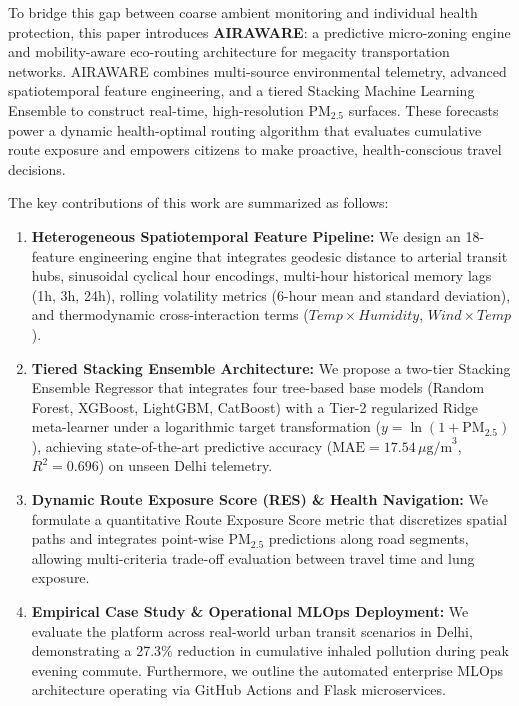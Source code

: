 \documentclass[journal]{IEEEtran}
\begin{document}
To bridge this gap between coarse ambient monitoring and individual health protection, this paper introduces \textbf{AIRAWARE}: a predictive micro-zoning engine and mobility-aware eco-routing architecture for megacity transportation networks. AIRAWARE combines multi-source environmental telemetry, advanced spatiotemporal feature engineering, and a tiered Stacking Machine Learning Ensemble to construct real-time, high-resolution $\text{PM}_{2.5}$ surfaces. These forecasts power a dynamic health-optimal routing algorithm that evaluates cumulative route exposure and empowers citizens to make proactive, health-conscious travel decisions.

The key contributions of this work are summarized as follows:
\begin{enumerate}
    \item \textbf{Heterogeneous Spatiotemporal Feature Pipeline:} We design an 18-feature engineering engine that integrates geodesic distance to arterial transit hubs, sinusoidal cyclical hour encodings, multi-hour historical memory lags (1h, 3h, 24h), rolling volatility metrics (6-hour mean and standard deviation), and thermodynamic cross-interaction terms ($Temp \times Humidity$, $Wind \times Temp$).
    \item \textbf{Tiered Stacking Ensemble Architecture:} We propose a two-tier Stacking Ensemble Regressor that integrates four tree-based base models (Random Forest, XGBoost, LightGBM, CatBoost) with a Tier-2 regularized Ridge meta-learner under a logarithmic target transformation ($y = \ln(1 + \text{PM}_{2.5})$), achieving state-of-the-art predictive accuracy ($\text{MAE} = 17.54\,\mu\text{g/m}^3$, $R^2 = 0.696$) on unseen Delhi telemetry.
    \item \textbf{Dynamic Route Exposure Score (RES) \& Health Navigation:} We formulate a quantitative Route Exposure Score metric that discretizes spatial paths and integrates point-wise $\text{PM}_{2.5}$ predictions along road segments, allowing multi-criteria trade-off evaluation between travel time and lung exposure.
    \item \textbf{Empirical Case Study \& Operational MLOps Deployment:} We evaluate the platform across real-world urban transit scenarios in Delhi, demonstrating a 27.3\% reduction in cumulative inhaled pollution during peak evening commute. Furthermore, we outline the automated enterprise MLOps architecture operating via GitHub Actions and Flask microservices.
\end{enumerate}
\end{document}
